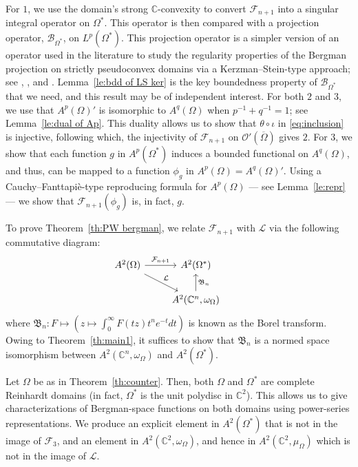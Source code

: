 \documentclass[11pt, oneside, reqno]{amsart}
\numberwithin{equation}{section}
\theoremstyle{definition}
\newcommand{\bes} {\begin{equation*}}
\newcommand{\ees} {\end{equation*}}
\newcommand{\hol}{\mathcal {O}}
\newcommand{\C}{\mathbb C}
\newcommand{\Cn}{{\mathbb{C}^n}}
\newcommand{\F}{\mathcal F}
\newcommand{\ltt}{\left(}
\newcommand{\rtt}{\right)}
\newcommand{\Om}{\Omega}
\begin{document}
{For $1$, we use the domain's strong $\C$-convexity to convert  $\mathcal F_{n+1}$ into a singular integral operator on $\Om^*$. This operator is then compared with a projection operator, $\mathcal B_{\Om^*}$, on $L^p(\Om^*)$. This projection operator is a simpler version of an operator used in the literature to study the regularity properties of the Bergman projection on strictly pseudoconvex domains via a Kerzman--Stein-type approach; see \cite{LI84}, \cite[\S~7.1]{Ra98}, and \cite{LS12}. Lemma~\ref{le:bdd of LS ker} is the key boundedness property of $\mathcal B_{\Om^*}$ that we need, and this result may be of independent interest. For both $2$ and $3$, we use that $A^p(\Om)'
$ is isomorphic to $A^q(\Om)$ when $p^{-1}+q^{-1}=1$; see Lemma~\ref{le:dual of Ap}. This duality allows us to show that $\theta\circ\iota$ in \eqref{eq:inclusion} is injective, following which, the injectivity of $\F_{n+1}$ on $\hol'\ltt\overline\Om\rtt$ gives $2$. For $3$, we show that each function $g$ in $A^p(\Om^*)$ induces a bounded functional on $A^q(\Om)$, and thus, can be mapped to a function $\phi_g$ in $A^p(\Om)=A^q(\Om)'$. Using a Cauchy--Fanttapi{\`e}-type reproducing formula for $A^p(\Om)$ --- see Lemma~\ref{le:repr} --- we show that $\mathcal F_{n+1}(\phi_g)$ is, in fact, $g$.

To prove Theorem~\ref{th:PW bergman}, we relate $\F_{n+1}$ with $\mathcal L$ via the following commutative diagram:
\bes \begin{tikzcd}
 A^2(\Om) \arrow{dr}{\mathcal L}  \arrow{r}{\mathcal F_{n+1}} & A^2(\Om^*)  
 \\%
& A^2(\Cn,\omega_\Om) \arrow[swap]{u}{\mathfrak B_n}
&  
\end{tikzcd}
\ees
where $\mathfrak B_n:F\mapsto\ltt z\mapsto \int_0^\infty F(tz)t^ne^{-t}dt\rtt$ is known as the Borel transform. Owing to Theorem~\ref{th:main1}, it suffices to show that $\mathfrak B_n$ is a normed space isomorphism between $A^2(\Cn,\omega_\Om)$ and $A^2(\Om^*)$.

Let $\Om$ be as in Theorem~\ref{th:counter}. Then, both $\Om$ and $\Om^*$ are complete Reinhardt domains (in fact, $\Om^*$ is the unit polydisc in $\C^2$). This allows us to give characterizations of Bergman-space functions on both domains using power-series representations. We produce an explicit element in $A^2(\Om^*)$ that is not in the image of $\mathcal F_3$, and an element in $A^2(\C^2,\omega_\Om)$, {and hence in $A^2(\C^2,\mu_\Om)$} which is not in the image of $\mathcal L$.
\vspace{2pt}
\medskip

}
\end{document}
